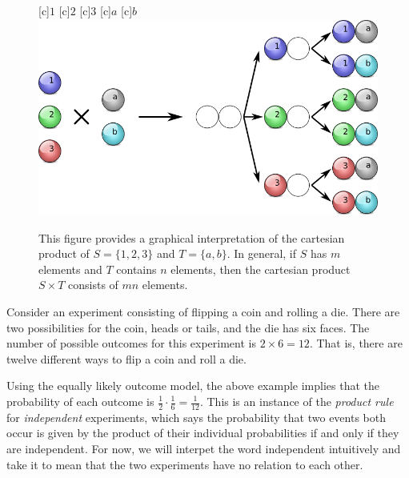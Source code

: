 \begin{figure}[htb!]
\begin{center}
\begin{psfrags}
[c]{$1$}
[c]{$2$}
[c]{$3$}
[c]{$a$}
[c]{$b$}
\includegraphics[height=6.495cm]{Figures/4Chapter/countingprinciple}
\end{psfrags}
\caption{This figure provides a graphical interpretation of the cartesian product of $S = \{ 1, 2, 3 \}$ and $T = \{ a, b \}$.
In general, if $S$ has $m$ elements and $T$ contains $n$ elements, then the cartesian product $S \times T$ consists of $m n$ elements.}
\label{figure:CountingPrinciple}
\end{center}
\end{figure}

\begin{example}
Consider an experiment consisting of flipping a coin and rolling a die.
There are two possibilities for the coin, heads or tails, and the die has six faces.
The number of possible outcomes for this experiment is $2 \times 6 = 12$.
That is, there are twelve different ways to flip a coin and roll a die.
\end{example}

Using the equally likely outcome model, the above example implies that the probability of each outcome is $\frac{1}{2} \cdot \frac{1}{6} = \frac{1}{12}$.
This is an instance of the \emph{product rule} for \emph{independent} experiments, which says the probability that two events both occur is given by the product of their individual probabilities if and only if they are independent.
For now, we will interpet the word independent intuitively and take it to mean that the two experiments have no relation to each other.


